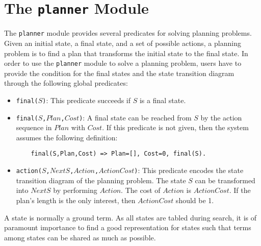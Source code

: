 \chapter{\label{chapter:planner}The \texttt{planner} Module}
The \texttt{planner} module provides several predicates for solving planning problems. Given an initial state, a final state, and a set of possible actions, a planning problem is to find a plan that transforms the initial state to the final state. In order to use the \texttt{planner} module to solve a planning problem, users have to provide the condition for the final states and the state transition diagram through the following global predicates:
\begin{itemize}
\item \texttt{final($S$)}: This predicate succeeds if $S$ is a final state.
\item \texttt{final($S$,$Plan$,$Cost$)}: A final state can be reached from $S$ by the action sequence in $Plan$ with $Cost$. If this predicate is not given, then the system assumes the following definition:
\begin{verbatim}
    final(S,Plan,Cost) => Plan=[], Cost=0, final(S).
\end{verbatim}

\item \texttt{action($S$,$NextS$,$Action$,$ActionCost$)}: This predicate encodes the state transition diagram of the planning problem. The state $S$ can be transformed into $NextS$ by performing $Action$. The cost of $Action$ is $ActionCost$. If the plan's length is the only interest, then $ActionCost$ should be 1.
\end{itemize}

A state is normally a ground term. As all states are tabled during search, it is of paramount importance to find a good representation for states such that terms among states can be shared as much as possible.

